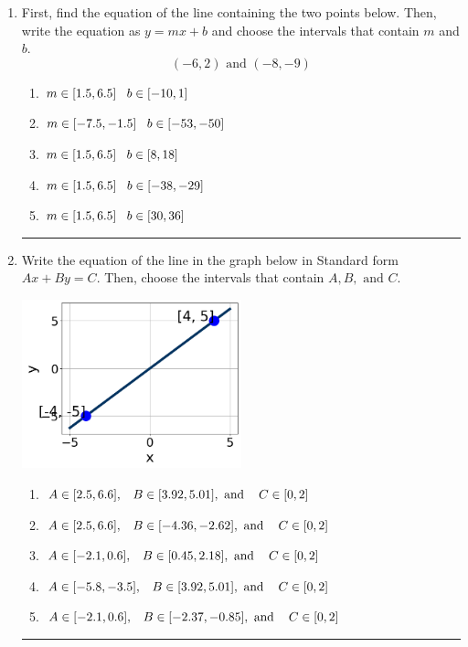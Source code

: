 \documentclass[14pt]{extbook}
\newcommand{\litem}[1]{\item#1\hspace*{-1cm}\rule{\textwidth}{0.4pt}}
\begin{document}
\begin{enumerate}
\litem{
First, find the equation of the line containing the two points below. Then, write the equation as $ y=mx+b $ and choose the intervals that contain $m$ and $b$.\[ (-6, 2) \text{ and } (-8, -9) \]\begin{enumerate}[label=\Alph*.]
\item \( m \in [1.5, 6.5] \hspace*{3mm} b \in [-10, 1] \)
\item \( m \in [-7.5, -1.5] \hspace*{3mm} b \in [-53, -50] \)
\item \( m \in [1.5, 6.5] \hspace*{3mm} b \in [8, 18] \)
\item \( m \in [1.5, 6.5] \hspace*{3mm} b \in [-38, -29] \)
\item \( m \in [1.5, 6.5] \hspace*{3mm} b \in [30, 36] \)

\end{enumerate} }
\litem{
Write the equation of the line in the graph below in Standard form $Ax+By=C$. Then, choose the intervals that contain $A, B, \text{ and } C$.
\begin{center}
    \includegraphics[width=0.5\textwidth]{../Figures/linearGraphToStandardC.png}
\end{center}
\begin{enumerate}[label=\Alph*.]
\item \( A \in [2.5, 6.6], \hspace{3mm} B \in [3.92, 5.01], \text{ and } \hspace{3mm} C \in [0, 2] \)
\item \( A \in [2.5, 6.6], \hspace{3mm} B \in [-4.36, -2.62], \text{ and } \hspace{3mm} C \in [0, 2] \)
\item \( A \in [-2.1, 0.6], \hspace{3mm} B \in [0.45, 2.18], \text{ and } \hspace{3mm} C \in [0, 2] \)
\item \( A \in [-5.8, -3.5], \hspace{3mm} B \in [3.92, 5.01], \text{ and } \hspace{3mm} C \in [0, 2] \)
\item \( A \in [-2.1, 0.6], \hspace{3mm} B \in [-2.37, -0.85], \text{ and } \hspace{3mm} C \in [0, 2] \)


\end{enumerate}}
\end{enumerate}
\end{document}
